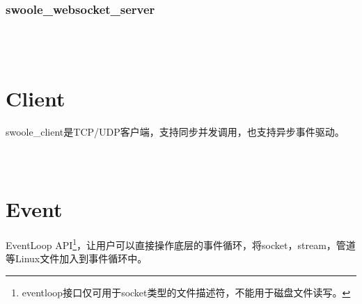 \subsection{swoole\_websocket\_server}


\begin{lstlisting}[language=bash]

\end{lstlisting}




\begin{lstlisting}[language=bash]

\end{lstlisting}




\begin{lstlisting}[language=bash]

\end{lstlisting}




\begin{lstlisting}[language=bash]

\end{lstlisting}


\chapter{Client}

swoole\_client是TCP/UDP客户端，支持同步并发调用，也支持异步事件驱动。


\begin{lstlisting}[language=bash]

\end{lstlisting}




\begin{lstlisting}[language=bash]

\end{lstlisting}




\begin{lstlisting}[language=bash]

\end{lstlisting}


\chapter{Event}

EventLoop API\footnote{eventloop接口仅可用于socket类型的文件描述符，不能用于磁盘文件读写。}，让用户可以直接操作底层的事件循环，将socket，stream，管道等Linux文件加入到事件循环中。


